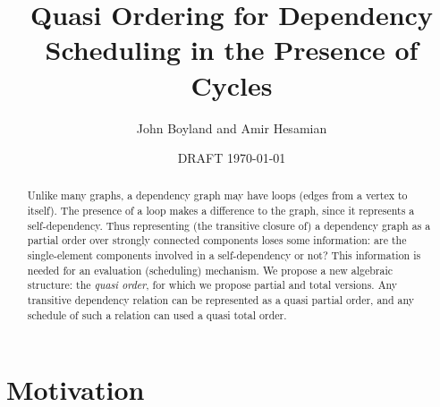 \documentclass[12pt]{article}
\begin{document}
\title{Quasi Ordering for Dependency Scheduling in the Presence of Cycles}
\author{John Boyland and Amir Hesamian}
\date{DRAFT \today}

\maketitle

\begin{abstract}
  Unlike many graphs, a dependency graph may have loops (edges from a
  vertex to itself).  The presence of a loop makes a difference to the
  graph, since it represents a self-dependency.  Thus representing
  (the transitive closure of) a dependency graph as a partial order
  over strongly connected components loses some information: are the
  single-element components involved in a self-dependency or not?
  This information is needed for an evaluation (scheduling)
  mechanism.  We propose a new algebraic structure: the \emph{quasi
  order}, for which we propose partial and total versions.  Any
  transitive dependency relation can be represented as a quasi partial
  order, and any schedule of such a relation can used a quasi total order. 
\end{abstract}

\section{Motivation}
\end{document}
